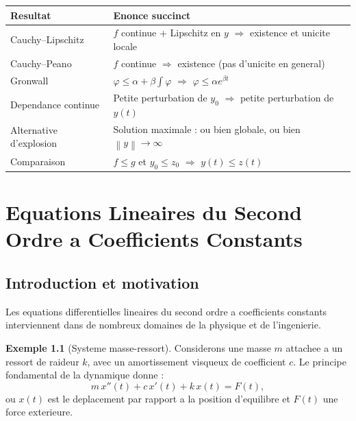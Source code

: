 \documentclass[12pt,a4paper,openany]{book}
\theoremstyle{definition}
\newtheorem{exemple}[definition]{Exemple}
\theoremstyle{plain}
\theoremstyle{remark}
\newcommand{\norm}[1]{\left\|#1\right\|}
\begin{document}
\begin{center}
\renewcommand{\arraystretch}{1.4}
\begin{tabular}{@{}p{4.5cm}p{9cm}@{}}
\toprule
\textbf{Resultat} & \textbf{Enonce succinct} \\
\midrule
Cauchy--Lipschitz & $f$ continue + Lipschitz en $y$ $\Rightarrow$ existence et unicite locale \\
Cauchy--Peano & $f$ continue $\Rightarrow$ existence (pas d'unicite en general) \\
Gronwall & $\varphi \leq \alpha + \beta \int \varphi$ $\Rightarrow$ $\varphi \leq \alpha e^{\beta t}$ \\
Dependance continue & Petite perturbation de $y_0$ $\Rightarrow$ petite perturbation de $y(t)$ \\
Alternative d'explosion & Solution maximale : ou bien globale, ou bien $\norm{y} \to \infty$ \\
Comparaison & $f \leq g$ et $y_0 \leq z_0$ $\Rightarrow$ $y(t) \leq z(t)$ \\
\bottomrule
\end{tabular}
\end{center}


\chapter{Equations Lineaires du Second Ordre a Coefficients Constants}\label{ch:edl2}

\section*{Introduction et motivation}

Les equations differentielles lineaires du second ordre a coefficients constants interviennent dans de nombreux domaines de la physique et de l'ingenierie.

\begin{exemple}[Systeme masse-ressort]\label{ex:masse-ressort}
Considerons une masse $m$ attachee a un ressort de raideur $k$, avec un amortissement visqueux de coefficient $c$. Le principe fondamental de la dynamique donne :
\[
  m\, x''(t) + c\, x'(t) + k\, x(t) = F(t),
\]
ou $x(t)$ est le deplacement par rapport a la position d'equilibre et $F(t)$ une force exterieure.
\end{exemple}
\end{document}

